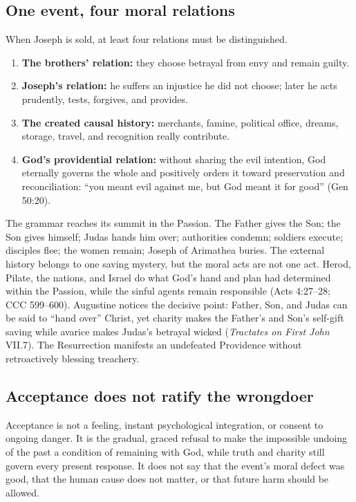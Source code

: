 \subsection{One event, four moral relations}

When Joseph is sold, at least four relations must be distinguished.

\begin{enumerate}[leftmargin=1.6em]
\item \textbf{The brothers' relation:} they choose betrayal from envy and remain guilty.
\item \textbf{Joseph's relation:} he suffers an injustice he did not choose; later he acts prudently, tests, forgives, and provides.
\item \textbf{The created causal history:} merchants, famine, political office, dreams, storage, travel, and recognition really contribute.
\item \textbf{God's providential relation:} without sharing the evil intention, God eternally governs the whole and positively orders it toward preservation and reconciliation: ``you meant evil against me, but God meant it for good'' (Gen 50:20).
\end{enumerate}

The grammar reaches its summit in the Passion. The Father gives the Son; the Son gives himself; Judas hands him over; authorities condemn; soldiers execute; disciples flee; the women remain; Joseph of Arimathea buries. The external history belongs to one saving mystery, but the moral acts are not one act. Herod, Pilate, the nations, and Israel do what God's hand and plan had determined within the Passion, while the sinful agents remain responsible (Acts 4:27--28; CCC 599--600). Augustine notices the decisive point: Father, Son, and Judas can be said to ``hand over'' Christ, yet charity makes the Father's and Son's self-gift saving while avarice makes Judas's betrayal wicked (\emph{Tractates on First John} VII.7). The Resurrection manifests an undefeated Providence without retroactively blessing treachery.

\subsection{Acceptance does not ratify the wrongdoer}

Acceptance is not a feeling, instant psychological integration, or consent to ongoing danger. It is the gradual, graced refusal to make the impossible undoing of the past a condition of remaining with God, while truth and charity still govern every present response. It does not say that the event's moral defect was good, that the human cause does not matter, or that future harm should be allowed.

